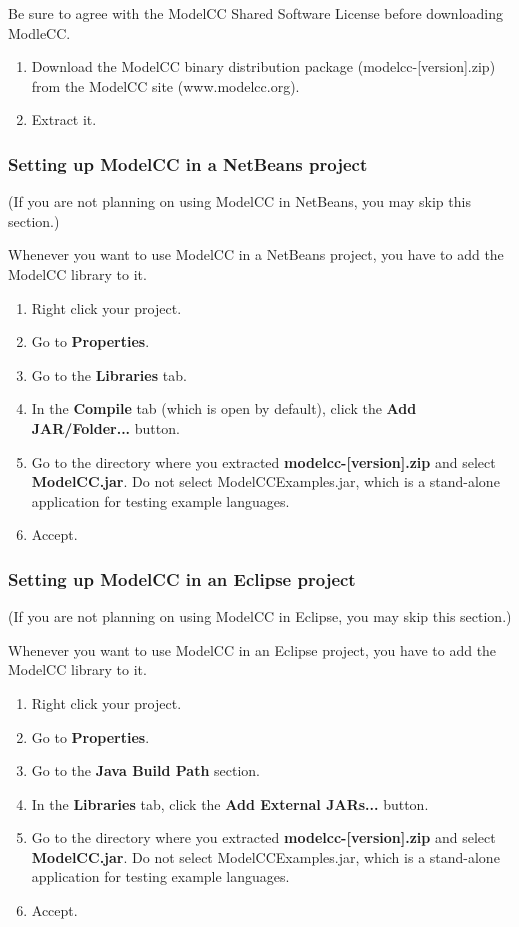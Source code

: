 \documentclass[a4paper,twoside,onecolumn]{article}
\begin{document}
Be sure to agree with the ModelCC Shared Software License before downloading ModleCC.

\begin{enumerate}
\item Download the ModelCC binary distribution package (modelcc-[version].zip) from the ModelCC site (www.modelcc.org).
\item Extract it.
\end{enumerate}

\subsubsection{Setting up ModelCC in a NetBeans project}

(If you are not planning on using ModelCC in NetBeans, you may skip this section.)

Whenever you want to use ModelCC in a NetBeans project, you have to add the ModelCC library to it.

\begin{enumerate}
\item Right click your project.
\item Go to {\bf Properties}.
\item Go to the {\bf Libraries} tab.
\item In the {\bf Compile} tab (which is open by default), click the {\bf Add JAR/Folder...} button.
\item Go to the directory where you extracted {\bf modelcc-[version].zip} and select {\bf ModelCC.jar}. Do not select ModelCCExamples.jar, which is a stand-alone application for testing example languages.
\item Accept.
\end{enumerate}

\subsubsection{Setting up ModelCC in an Eclipse project}

(If you are not planning on using ModelCC in Eclipse, you may skip this section.)

Whenever you want to use ModelCC in an Eclipse project, you have to add the ModelCC library to it.

\begin{enumerate}
\item Right click your project.
\item Go to {\bf Properties}.
\item Go to the {\bf Java Build Path} section.
\item In the {\bf Libraries} tab, click the {\bf Add External JARs...} button.
\item Go to the directory where you extracted {\bf modelcc-[version].zip} and select {\bf ModelCC.jar}. Do not select ModelCCExamples.jar, which is a stand-alone application for testing example languages.
\item Accept.
\end{enumerate}
\end{document}
